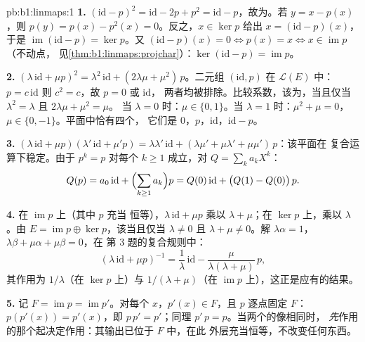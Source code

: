 \begin{solution}{pb:b1:linmaps:1}
\textbf{1.} $(\mathrm{id} - p)^2 = \mathrm{id} - 2p + p^2 =
\mathrm{id} - p$，故为。若 $y = x - p(x)$，则 $p(y) =
p(x) - p^2(x) = 0$。反之，$x \in \ker p$ 给出 $x =
(\mathrm{id} - p)(x)$，于是 $\operatorname{im}(\mathrm{id} - p) = \ker
p$。又 $(\mathrm{id} - p)(x) = 0 \iff p(x) = x \iff x \in
\operatorname{im} p$（不动点，
见\cref{thm:b1:linmaps:projchar}）：$\ker(\mathrm{id} - p) =
\operatorname{im} p$。

\textbf{2.} $(\lambda\,\mathrm{id} + \mu p)^2 =
\lambda^2\,\mathrm{id} + (2\lambda\mu + \mu^2)\,p$。二元组
$(\mathrm{id}, p)$ 在 $\mathcal{L}(E)$ 中：$p = c\,
\mathrm{id}$ 则 $c^2 = c$，故 $p = 0$ 或 $\mathrm{id}$，
两者均被排除。比较系数，该为，当且仅当
$\lambda^2 = \lambda$ 且 $2\lambda\mu + \mu^2 = \mu$。
当 $\lambda = 0$ 时：$\mu \in \{0, 1\}$。当 $\lambda = 1$ 时：$\mu^2 +
\mu = 0$，$\mu \in \{0, -1\}$。平面中恰有四个，
它们是 $0$，$p$，$\mathrm{id}$，$\mathrm{id} - p$。

\textbf{3.} $(\lambda\,\mathrm{id} + \mu p)(\lambda'\,\mathrm{id}
+ \mu' p) = \lambda\lambda'\,\mathrm{id} + (\lambda\mu' +
\mu\lambda' + \mu\mu')\,p$：该平面在
复合运算下稳定。由于 $p^k = p$ 对每个 $k \geq 1$ 成立，对 $Q =
\sum_k a_k X^k$：
\[
Q(p) = a_0\,\mathrm{id} + \Bigl(\sum_{k \geq 1} a_k\Bigr) p
= Q(0)\,\mathrm{id} + \bigl(Q(1) - Q(0)\bigr)\,p .
\]

\textbf{4.} 在 $\operatorname{im} p$ 上（其中 $p$ 充当
恒等），$\lambda\,\mathrm{id} + \mu p$ 乘以 $\lambda
+ \mu$；在 $\ker p$ 上，乘以 $\lambda$。由 $E = \operatorname{im} p
\oplus \ker p$，该当且仅当 $\lambda \neq 0$ 且
$\lambda + \mu \neq 0$。解 $\lambda\alpha = 1$，
$\lambda\beta + \mu\alpha + \mu\beta = 0$，在
第 3 题的复合规则中：
\[
(\lambda\,\mathrm{id} + \mu p)^{-1}
= \frac1\lambda\,\mathrm{id} -
\frac{\mu}{\lambda(\lambda + \mu)}\,p ,
\]
其作用为 $1/\lambda$（在 $\ker p$ 上）与 $1/(\lambda +
\mu)$（在 $\operatorname{im} p$ 上），这正是应有的结果。

\textbf{5.} 记 $F = \operatorname{im} p = \operatorname{im}
p'$。对每个 $x$，$p'(x) \in F$，且 $p$ 逐点固定 $F$：
$p(p'(x)) = p'(x)$，即 $p\,p' = p'$；同理 $p'\,p =
p$。当两个的像相同时，
\emph{先}作用的那个起决定作用：其输出已位于 $F$ 中，在此
外层充当恒等，不改变任何东西。


\end{solution}
